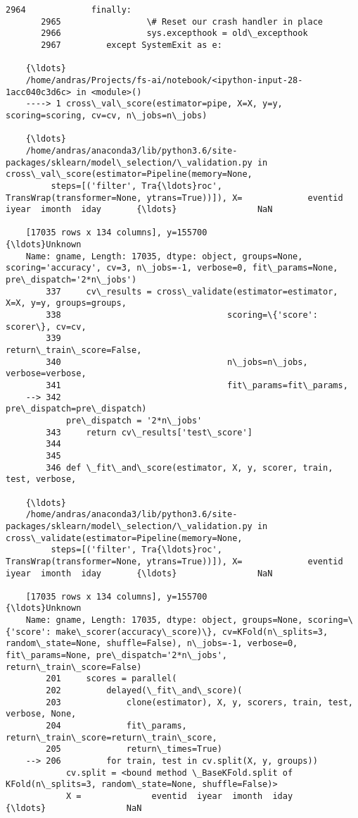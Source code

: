 \documentclass[11pt]{article}
\begin{document}
\begin{Verbatim}[commandchars=\\\{\}]
       2964             finally:
       2965                 \# Reset our crash handler in place
       2966                 sys.excepthook = old\_excepthook
       2967         except SystemExit as e:
    
    {\ldots}
    /home/andras/Projects/fs-ai/notebook/<ipython-input-28-1acc040c3d6c> in <module>()
    ----> 1 cross\_val\_score(estimator=pipe, X=X, y=y, scoring=scoring, cv=cv, n\_jobs=n\_jobs)
    
    {\ldots}
    /home/andras/anaconda3/lib/python3.6/site-packages/sklearn/model\_selection/\_validation.py in cross\_val\_score(estimator=Pipeline(memory=None,
         steps=[('filter', Tra{\ldots}roc', TransWrap(transformer=None, ytrans=True))]), X=             eventid  iyear  imonth  iday       {\ldots}                NaN  
    
    [17035 rows x 134 columns], y=155700                                          {\ldots}Unknown
    Name: gname, Length: 17035, dtype: object, groups=None, scoring='accuracy', cv=3, n\_jobs=-1, verbose=0, fit\_params=None, pre\_dispatch='2*n\_jobs')
        337     cv\_results = cross\_validate(estimator=estimator, X=X, y=y, groups=groups,
        338                                 scoring=\{'score': scorer\}, cv=cv,
        339                                 return\_train\_score=False,
        340                                 n\_jobs=n\_jobs, verbose=verbose,
        341                                 fit\_params=fit\_params,
    --> 342                                 pre\_dispatch=pre\_dispatch)
            pre\_dispatch = '2*n\_jobs'
        343     return cv\_results['test\_score']
        344 
        345 
        346 def \_fit\_and\_score(estimator, X, y, scorer, train, test, verbose,
    
    {\ldots}
    /home/andras/anaconda3/lib/python3.6/site-packages/sklearn/model\_selection/\_validation.py in cross\_validate(estimator=Pipeline(memory=None,
         steps=[('filter', Tra{\ldots}roc', TransWrap(transformer=None, ytrans=True))]), X=             eventid  iyear  imonth  iday       {\ldots}                NaN  
    
    [17035 rows x 134 columns], y=155700                                          {\ldots}Unknown
    Name: gname, Length: 17035, dtype: object, groups=None, scoring=\{'score': make\_scorer(accuracy\_score)\}, cv=KFold(n\_splits=3, random\_state=None, shuffle=False), n\_jobs=-1, verbose=0, fit\_params=None, pre\_dispatch='2*n\_jobs', return\_train\_score=False)
        201     scores = parallel(
        202         delayed(\_fit\_and\_score)(
        203             clone(estimator), X, y, scorers, train, test, verbose, None,
        204             fit\_params, return\_train\_score=return\_train\_score,
        205             return\_times=True)
    --> 206         for train, test in cv.split(X, y, groups))
            cv.split = <bound method \_BaseKFold.split of KFold(n\_splits=3, random\_state=None, shuffle=False)>
            X =              eventid  iyear  imonth  iday       {\ldots}                NaN  
    

\end{Verbatim}
\end{document}
